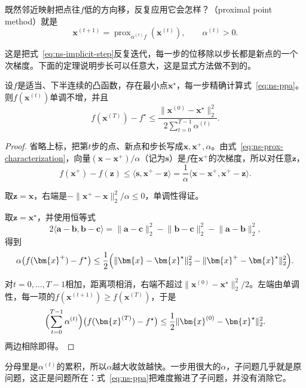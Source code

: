既然邻近映射把点往$f$低的方向移，反复应用它会怎样？（proximal point method）就是
\begin{equation}
 \bm{x}^{(t+1)}=\operatorname{prox}_{\alpha^{(t)}f}(\bm{x}^{(t)}),\qquad\alpha^{(t)}>0.
 \label{eq:ns-ppa}
\end{equation}

这是把式~\eqref{eq:ns-implicit-step}反复迭代，每一步的位移除以步长都是新点的一个次梯度。下面的定理说明步长可以任意大，这是显式方法做不到的。

\begin{theorem}[邻近点法的目标差界]
\label{thm:ns-ppa}
设$f$是适当、下半连续的凸函数，存在最小点$\bm{x}^\star$，每一步精确计算式~\eqref{eq:ns-ppa}。则$f(\bm{x}^{(t)})$单调不增，并且
\begin{equation}
 f(\bm{x}^{(T)})-f^\star\leq\frac{\lVert\bm{x}^{(0)}-\bm{x}^\star\rVert_2^2}{2\sum_{t=0}^{T-1}\alpha^{(t)}}.
 \label{eq:ns-ppa-rate}
\end{equation}
\end{theorem}

\begin{proof}
省略上标，把第$t$步的点、新点和步长写成$\bm{x},\bm{x}^{+},\alpha$。由式~\eqref{eq:ns-prox-characterization}，向量$(\bm{x}-\bm{x}^{+})/\alpha$（记为$\bm{s}$）是$f$在$\bm{x}^{+}$的次梯度，所以对任意$\bm{z}$，
\[
 f(\bm{x}^{+})-f(\bm{z})\leq\langle\bm{s},\bm{x}^{+}-\bm{z}\rangle=\frac1\alpha\langle\bm{x}-\bm{x}^{+},\bm{x}^{+}-\bm{z}\rangle.
\]

取$\bm{z}=\bm{x}$，右端是$-\lVert\bm{x}^{+}-\bm{x}\rVert_2^2/\alpha\leq0$，单调性得证。

取$\bm{z}=\bm{x}^\star$，并使用恒等式
\begin{equation}
 2\langle\bm{a}-\bm{b},\bm{b}-\bm{c}\rangle=\lVert\bm{a}-\bm{c}\rVert_2^2-\lVert\bm{b}-\bm{c}\rVert_2^2-\lVert\bm{a}-\bm{b}\rVert_2^2,
 \label{eq:ns-three-point}
\end{equation}
得到
\[
 \alpha\bigl(f(\bm{x}^{+})-f^\star\bigr)\leq\frac12\Bigl(\lVert\bm{x}-\bm{x}^\star\rVert_2^2-\lVert\bm{x}^{+}-\bm{x}^\star\rVert_2^2\Bigr).
\]

对$t=0,\ldots,T-1$相加，距离项相消，右端不超过$\lVert\bm{x}^{(0)}-\bm{x}^\star\rVert_2^2/2$。左端由单调性，每一项的$f(\bm{x}^{(t+1)})\geq f(\bm{x}^{(T)})$，于是
\[
 \Bigl(\sum_{t=0}^{T-1}\alpha^{(t)}\Bigr)\bigl(f(\bm{x}^{(T)})-f^\star\bigr)\leq\frac12\lVert\bm{x}^{(0)}-\bm{x}^\star\rVert_2^2.
\]
两边相除即得。
\end{proof}

分母里是$\alpha^{(t)}$的累积，所以$\alpha$越大收敛越快。一步用很大的$\alpha$，子问题几乎就是原问题，这正是问题所在：式~\eqref{eq:ns-ppa}把难度搬进了子问题，并没有消除它。

